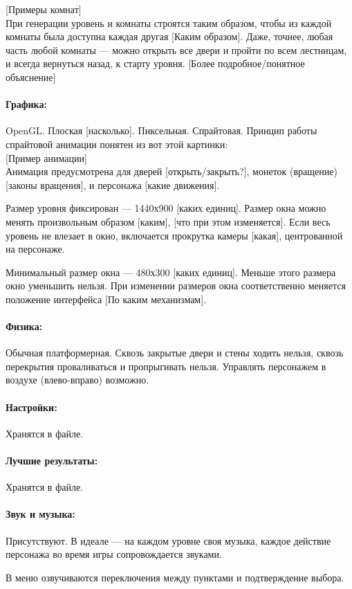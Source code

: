 \documentclass[12pt,a4paper]{article}
\begin{document}
{\color{blue}[Примеры комнат]}\\

При генерации уровень и комнаты строятся таким образом, чтобы из каждой комнаты была доступна каждая другая {\color{red} [Каким образом]}. Даже, точнее, любая часть любой комнаты --- можно открыть все двери и пройти по всем лестницам, и всегда вернуться назад, к старту уровня. {\color{red} [Более подробное/понятное объяснение]}

\paragraph{Графика:}
OpenGL. Плоская {\color{red} [насколько]}. Пиксельная. Спрайтовая. Принцип работы спрайтовой анимации понятен из вот этой картинки:\\

{\color{blue}[Пример анимации]}\\

Анимация предусмотрена для дверей {\color{red} [открыть/закрыть?]}, монеток (вращение) {\color{red} [законы вращения]}, и персонажа {\color{red} [какие движения]}.

Размер уровня фиксирован --- 1440х900 {\color{red} [каких единиц]}. Размер окна можно менять произвольным образом {\color{red} [каким], [что при этом изменяется]}. Если весь уровень не влезает в окно, включается прокрутка камеры {\color{red} [какая]}, центрованной на персонаже.

Минимальный размер окна --- 480х300 {\color{red} [каких единиц]}. Меньше этого размера окно уменьшить нельзя. При изменении размеров окна соответственно меняется положение интерфейса{\color{red} [По каким механизмам]}.

\paragraph{Физика:}
Обычная платформерная. Сквозь закрытые двери и стены ходить нельзя, сквозь перекрытия проваливаться и пропрыгивать нельзя. Управлять персонажем в воздухе (влево-вправо) возможно.

\paragraph{Настройки:}
Хранятся в файле.

\paragraph{Лучшие результаты:}
Хранятся в файле.

\paragraph{Звук и музыка:}
Присутствуют. В идеале --- на каждом уровне своя музыка, каждое действие персонажа во время игры сопровождается звуками.

В меню озвучиваются переключения между пунктами и подтверждение выбора.
\end{document}
